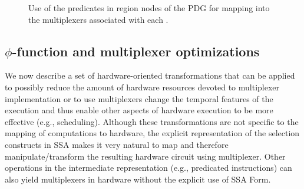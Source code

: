 \begin{figure}[htb]
  \centering
\caption{Use of the predicates in region nodes of the PDG for mapping into the multiplexers associated with each \phifun.}
\label{fig:Fig.4.7}
\end{figure}


\subsection{$\phi$-function and multiplexer optimizations}
We now describe a set of hardware-oriented transformations that can be applied to possibly reduce the amount of hardware resources devoted to multiplexer implementation or to use multiplexers change the temporal features of the execution and thus enable other aspects of hardware execution to be more effective (e.g., scheduling).
Although these transformations are not specific to the mapping of computations to hardware, the explicit representation of the selection constructs in SSA makes it very natural to map and therefore manipulate/transform the resulting hardware circuit using multiplexer. 
Other operations in the intermediate representation (e.g., predicated instructions) can also yield multiplexers in hardware without the explicit use of SSA Form.

